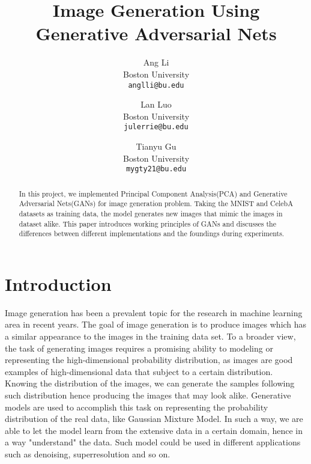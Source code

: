 \documentclass[10pt,twocolumn,letterpaper]{article}
\begin{document}
\title{Image Generation Using Generative Adversarial Nets}

\author{Ang Li\\
Boston University\\
{\tt\small anglli@bu.edu}
\and
Lan Luo\\
Boston University\\
{\tt\small julerrie@bu.edu}
\and
Tianyu Gu\\
Boston University\\
{\tt\small mygty21@bu.edu}
}

\maketitle

\begin{abstract}
In this project, we implemented Principal Component Analysis(PCA) and Generative Adversarial Nets(GANs) for image generation problem. Taking the MNIST and CelebA datasets as training data, the model generates new images that mimic the images in dataset alike. This paper introduces working principles of GANs and discusses the differences between different implementations and the foundings during experiments.
\end{abstract}

\section{Introduction}

Image generation has been a prevalent topic for the research in machine learning area in recent years. The goal of image generation is to produce images which has a similar appearance to the images in the training data set. To a broader view, the task of generating images requires a promising ability to modeling or representing the high-dimensional probability distribution, as images are good examples of high-dimensional data that subject to a certain distribution. Knowing the distribution of the images, we can generate the samples following such distribution hence producing the images that may look alike. Generative models are used to accomplish this task on representing the probability distribution of the real data, like Gaussian Mixture Model. In such a way, we are able to let the model learn from the extensive data in a certain domain, hence in a way "understand" the data. Such model could be used in different applications such as denoising, superresolution and so on.
\end{document}
